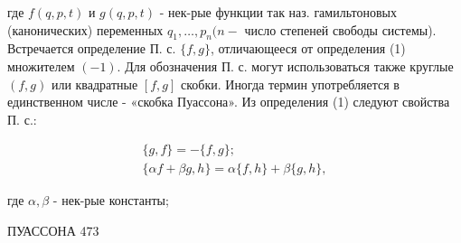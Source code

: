 \documentclass[10pt]{article}
\begin{document}
где $f(q, p, t)$ и $g(q, p, t)$ - нек-рые функции так наз. гамильтоновых (канонических) переменных $q_{1}, \ldots, p_{n}(n-$ число степеней свободы системы). Встречается определение П. с. $\{f, g\}$, отличающееся от определения (1) множителем $(-1)$. Для обозначения П. с. могут использоваться также круглые $(f, g)$ или квадратные $[f, g]$ скобки. Иногда термин употребляется в единственном числе - «скобка Пуассона». Из определения (1) следуют свойства П. с.:



\[

\begin{gathered}

\{g, f\}=-\{f, g\} ; \\

\{\alpha f+\beta g, h\}=\alpha\{f, h\}+\beta\{g, h\},

\end{gathered}

\]



где $\alpha, \beta$ - нек-рые константы;



ПУАССОНА 473
\end{document}
